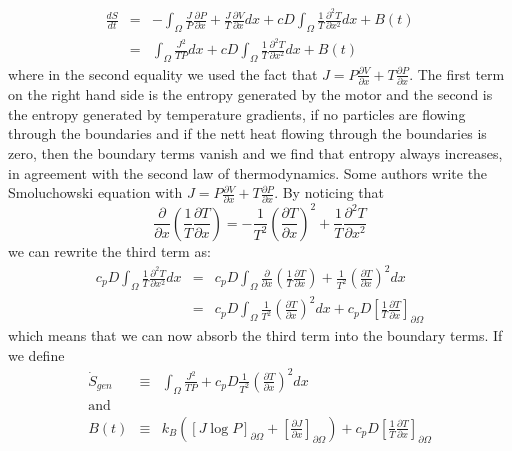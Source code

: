 \begin{eqnarray}
\frac{d S}{d t} & = & - \int_{\Omega} \frac{J}{P} \frac{\partial P}{\partial x} + \frac{J}{T} \frac{\partial V}{\partial x} dx +  c D \int_{\Omega} \frac{1}{T} \frac{\partial^2 T}{\partial x^2} dx + B(t) \\
                    & = & \int_{\Omega} \frac{J^2}{T P} dx + c D \int_{\Omega} \frac{1}{T} \frac{\partial^2 T}{\partial x^2} dx + B(t)
\end{eqnarray}
where in the second equality we used the fact that $J = P \frac{\partial V}{\partial x} + T \frac{\partial P}{\partial x}$. The first term on the right hand side is the entropy generated by the motor and the second is the entropy generated by temperature gradients, if no particles are flowing through the boundaries and if the nett heat flowing through the boundaries is zero, then the boundary terms vanish and we find that entropy always increases, in agreement with the second law of thermodynamics. Some authors write the Smoluchowski equation with $J = P \frac{\partial V}{\partial x} + T \frac{\partial P}{\partial x}$. By noticing that
\begin{equation}
\frac{\partial}{\partial x} \left(\frac{1}{T} \frac{\partial T}{\partial x} \right) = -\frac{1}{T^2} \left(\frac{\partial T}{\partial x} \right)^2 + \frac{1}{T} \frac{\partial^2 T}{\partial x^2}
\end{equation}
we can rewrite the third term as:
\begin{eqnarray}
c_p D \int_{\Omega} \frac{1}{T} \frac{\partial^2 T}{\partial x^2} dx &=& c_p D \int_{\Omega} \frac{\partial}{\partial x} \left(\frac{1}{T} \frac{\partial T}{\partial x} \right) + \frac{1}{T^2} \left(\frac{\partial T}{\partial x} \right)^2 dx \\
 &=& c_p D \int_{\Omega} \frac{1}{T^2} \left(\frac{\partial T}{\partial x} \right)^2 dx + c_p D\left[\frac{1}{T} \frac{\partial T}{\partial x} \right]_{\partial \Omega}
\end{eqnarray}
which means that we can now absorb the third term into the boundary terms. If we define
\begin{eqnarray}
\dot{S}_{gen} &\equiv& \int_{\Omega} \frac{J^2}{T P} + c_p D \frac{1}{T^2} \left(\frac{\partial T}{\partial x} \right)^2 dx \\
\text{and} \nonumber \\
B(t) &\equiv& k_B \left( [J \log P]_{\partial \Omega} + \left[\frac{\partial J}{\partial x}\right]_{\partial \Omega} \right) + c_p D\left[\frac{1}{T} \frac{\partial T}{\partial x} \right]_{\partial \Omega}
\end{eqnarray}
